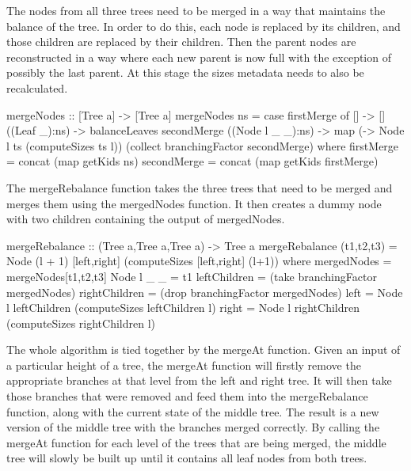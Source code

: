 \documentclass[11pt,a4paper,oneside]{article}
\begin{document}
The nodes from all three trees need to be merged in a way that maintains the balance of the tree. In order to do this, each node is replaced by its children, and those children are replaced by their children. Then the parent nodes are reconstructed in a way where each new parent is now full with the exception of possibly the last parent. At this stage the sizes metadata needs to also be recalculated.  

\begin{haskell}

mergeNodes :: [Tree a] -> [Tree a]
mergeNodes ns = case firstMerge of
                  []                 -> []
                  ((Leaf _):ns)      -> balanceLeaves secondMerge
                  ((Node l _ _):ns)  -> map (\ts -> Node l ts (computeSizes ts l)) (collect branchingFactor secondMerge)
                where firstMerge  = concat (map getKids ns)
                      secondMerge = concat (map getKids firstMerge)

\end{haskell}

The mergeRebalance function takes the three trees that need to be merged and merges them using the mergedNodes function. It then creates a dummy node with two children containing the output of mergedNodes.  

\begin{haskell}

mergeRebalance :: (Tree a,Tree a,Tree a) -> Tree a
mergeRebalance (t1,t2,t3) = Node (l + 1) [left,right] (computeSizes [left,right] (l+1))
                    where mergedNodes = mergeNodes[t1,t2,t3]
                          Node l _ _  = t1
                          leftChildren = (take branchingFactor mergedNodes)
                          rightChildren = (drop branchingFactor mergedNodes)
                          left = Node l leftChildren (computeSizes leftChildren l)
                          right = Node l rightChildren (computeSizes rightChildren l)

\end{haskell}

The whole algorithm is tied together by the mergeAt function. Given an input of a particular height of a tree, the mergeAt function will firstly remove the appropriate branches at that level from the left and right tree. It will then take those branches that were removed and feed them into the mergeRebalance function, along with the current state of the middle tree. The result is a new version of the middle tree with the branches merged correctly. By calling the mergeAt function for each level of the trees that are being merged, the middle tree will slowly be built up until it contains all leaf nodes from both trees.
\end{document}
